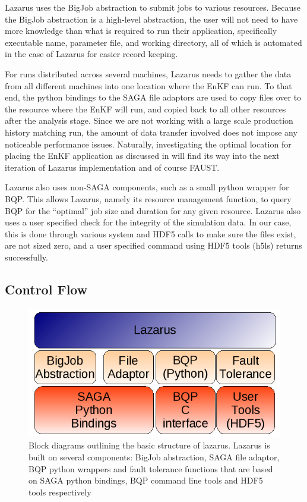 \documentclass[conference,final]{IEEEtran}
\begin{document}
Lazarus uses the BigJob abstraction to submit jobs to various resources.
Because the BigJob abstraction is a high-level abstraction, the user
will not need to have more knowledge than what is required to run their
application, specifically executable name, parameter file, and working directory, all of which is automated in the case of Lazarus for easier record keeping.

For runs distributed across several machines, Lazarus needs to gather
the data from all different machines into one location where the EnKF
can run. To that end, the python bindings to the SAGA file adaptors are used
to copy files over to the resource where the EnKF will run, and copied
back to all other resources after the analysis stage. Since we are not working
with a large scale production history matching run, the amount
of data transfer involved does not impose any noticeable performance issues. Naturally,
investigating the optimal location for placing the EnKF application
as discussed in \cite{escience07} will find its way into the next iteration
of Lazarus implementation and of course FAUST.

Lazarus also uses non-SAGA components, such as a small python wrapper
for BQP. This allows Lazarus, namely its resource management function, to query
BQP for the ``optimal'' job size and duration for any given resource. Lazarus
also uses a user specified check for the integrity of the simulation data. In our
case, this is done through various system and HDF5 calls to make sure the files exist,
are not sized zero, and a user specified command using HDF5 tools (h5ls) returns successfully.



\subsection{Control Flow}

\begin{figure}
\begin{center}
\includegraphics[scale=0.5]{./figures/Architecture.png}
\caption{Block diagrams outlining the basic structure of lazarus. Lazarus is built on
several components: BigJob abstraction, SAGA file adaptor, BQP python wrappers and fault tolerance
functions that are based on SAGA python bindings, BQP command line tools and HDF5 tools respectively
}
\end{center}

\label{fig:application_architecture}
\end{figure}
\end{document}
